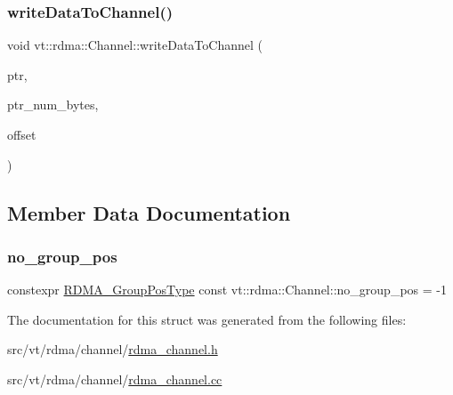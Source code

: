\subsubsection{\texorpdfstring{write\+Data\+To\+Channel()}{writeDataToChannel()}}
{\footnotesize\ttfamily void vt\+::rdma\+::\+Channel\+::write\+Data\+To\+Channel (\begin{DoxyParamCaption}\item[{\hyperlink{namespacevt_a9e2c953286c7616f7c218e9951790776}{R\+D\+M\+A\+\_\+\+Ptr\+Type} const \&}]{ptr,  }\item[{\hyperlink{namespacevt_aab8d55968084610ce3b17057981e9300}{Byte\+Type} const \&}]{ptr\+\_\+num\+\_\+bytes,  }\item[{\hyperlink{namespacevt_aab8d55968084610ce3b17057981e9300}{Byte\+Type} const \&}]{offset }\end{DoxyParamCaption})}



\subsection{Member Data Documentation}
\mbox{\label{structvt_1_1rdma_1_1_channel_a5b8e4d79d272951f51a9856705110d24}} 
\subsubsection{\texorpdfstring{no\+\_\+group\+\_\+pos}{no\_group\_pos}}
{\footnotesize\ttfamily constexpr \hyperlink{structvt_1_1rdma_1_1_channel_ae67759ab26cc035489edd369ae207cfc}{R\+D\+M\+A\+\_\+\+Group\+Pos\+Type} const vt\+::rdma\+::\+Channel\+::no\+\_\+group\+\_\+pos = -\/1\hspace{0.3cm}{\ttfamily [static]}}



The documentation for this struct was generated from the following files\+:\begin{DoxyCompactItemize}
\item 
src/vt/rdma/channel/\hyperlink{rdma__channel_8h}{rdma\+\_\+channel.\+h}\item 
src/vt/rdma/channel/\hyperlink{rdma__channel_8cc}{rdma\+\_\+channel.\+cc}\end{DoxyCompactItemize}
